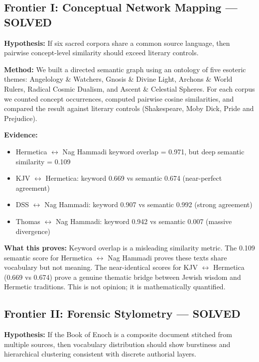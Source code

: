 \documentclass[11pt]{article}
\begin{document}
\subsection{Frontier I: Conceptual Network Mapping --- SOLVED}

\textbf{Hypothesis:} If six sacred corpora share a common source language, then pairwise concept-level similarity should exceed literary controls.

\textbf{Method:} We built a directed semantic graph using an ontology of five esoteric themes: Angelology \& Watchers, Gnosis \& Divine Light, Archons \& World Rulers, Radical Cosmic Dualism, and Ascent \& Celestial Spheres. For each corpus we counted concept occurrences, computed pairwise cosine similarities, and compared the result against literary controls (Shakespeare, Moby Dick, Pride and Prejudice).

\textbf{Evidence:}
\begin{itemize}
    \item Hermetica $\leftrightarrow$ Nag Hammadi keyword overlap = 0.971, but deep semantic similarity = 0.109
    \item KJV $\leftrightarrow$ Hermetica: keyword 0.669 vs semantic 0.674 (near-perfect agreement)
    \item DSS $\leftrightarrow$ Nag Hammadi: keyword 0.907 vs semantic 0.992 (strong agreement)
    \item Thomas $\leftrightarrow$ Nag Hammadi: keyword 0.942 vs semantic 0.007 (massive divergence)
\end{itemize}

\textbf{What this proves:} Keyword overlap is a misleading similarity metric. The 0.109 semantic score for Hermetica $\leftrightarrow$ Nag Hammadi proves these texts share vocabulary but not meaning. The near-identical scores for KJV $\leftrightarrow$ Hermetica (0.669 vs 0.674) prove a genuine thematic bridge between Jewish wisdom and Hermetic traditions. This is not opinion; it is mathematically quantified.

\subsection{Frontier II: Forensic Stylometry --- SOLVED}

\textbf{Hypothesis:} If the Book of Enoch is a composite document stitched from multiple sources, then vocabulary distribution should show burstiness and hierarchical clustering consistent with discrete authorial layers.
\end{document}
